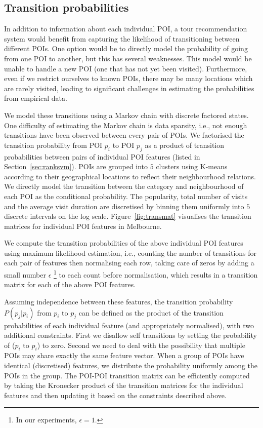 \subsection{Transition probabilities}
\label{sec:transition}

In addition to information about each individual POI, a tour recommendation system would benefit
from capturing the likelihood of transitioning between different POIs. One option would be to
directly model the probability of going from one POI to another, but this has several weaknesses.
This model would be unable to handle a new POI (one that has not yet been visited).
Furthermore, even if we restrict ourselves to known POIs, there may be many locations which
are rarely visited, leading to significant challenges in estimating the probabilities from
empirical data.

We model these transitions using a Markov chain with discrete factored states.
One difficulty of estimating the Markov chain is data sparsity, 
i.e., not enough transitions have been observed between every pair of POIs. 
We factorised the transition probability from POI $p_i$ to POI $p_j$ %
as a product of transition probabilities between pairs of 
individual POI features (listed in Section~\ref{sec:ranksvm}).
POIs are grouped into $5$ clusters using K-means according to their geographical locations
to reflect their neighbourhood relations.
We directly model the transition between the category and neighbourhood of each POI as the conditional probability.
The popularity, total number of visits and the average visit duration are discretised by binning
them uniformly into $5$ discrete intervals on the log scale.
Figure~\ref{fig:transmat} visualises the transition matrices for individual POI features in Melbourne.

We compute the transition probabilities of the above individual POI features
using maximum likelihood estimation,
i.e., counting the number of transitions for each pair of features then normalising each row,
taking care of zeros by adding a small number $\epsilon$
\footnote{In our experiments, $\epsilon = 1$.}
to each count before normalisation,
which results in a transition matrix for each of the above POI features.

Assuming independence between these features,
the transition probability $P(p_j | p_i)$ from $p_i$ to $p_j$ can be defined as the product
of the transition probabilities of each individual feature (and appropriately normalised),
with two additional constraints.
First we disallow self transitions by setting the probability of ($p_i$ to $p_i$) to zero.
Second we need to deal with the possibility that multiple POIs may share exactly the same
feature vector.
When a group of POIs have identical (discretised) features, we distribute the probability
uniformly among the POIs in the group. 
The POI-POI transition matrix can be efficiently computed by taking the Kronecker product of
the transition matrices for the individual features and then updating it based on the constraints described above.

